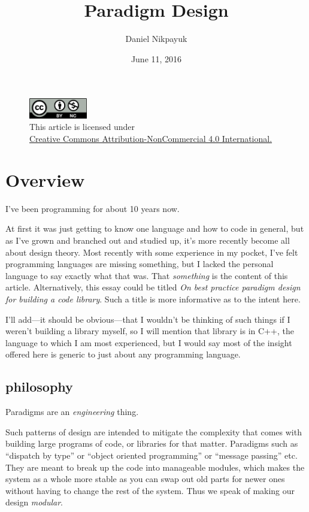\documentclass[twoside]{article}
\title{Paradigm Design}
\author{Daniel Nikpayuk}
\date{June 11, 2016}
\begin{document}
\maketitle
\thispagestyle{empty}

\begin{figure}[h]
\centering
\includegraphics[width=1in]{../../../cc-by-nc.png}\\[0.1in]
\tiny This article is licensed under \\
\href{http://creativecommons.org/licenses/by-nc/4.0/}
{Creative Commons Attribution-NonCommercial 4.0 International.}\\[0.3in]
\end{figure}

\section*{Overview}

I've been programming for about 10 years now.

At first it was just getting to know one language and how to code in general, but as I've grown and branched out and
studied up, it's more recently become all about design theory. Most recently with some experience in my pocket,
I've felt programming languages are missing something, but I lacked the personal language to say exactly what that was.
That \emph{something} is the content of this article.  Alternatively, this essay could be titled \emph{On best
practice paradigm design for building a code library}. Such a title is more informative as to the intent here.

I'll add---it should be obvious---that I wouldn't be thinking of such things if I weren't building a library myself,
so I will mention that library is in C++, the language to which I am most experienced, but I would say most
of the insight offered here is generic to just about any programming language.

\subsection*{philosophy}

Paradigms are an \emph{engineering} thing.

Such patterns of design are intended to mitigate the complexity that comes with building large programs of code, or libraries
for that matter. Paradigms such as ``dispatch by type'' or ``object oriented programming'' or ``message passing'' etc.
They are meant to break up the code into manageable modules, which makes the system as a whole more stable as you can swap
out old parts for newer ones without having to change the rest of the system. Thus we speak of making our design \emph{modular}.
\end{document}

